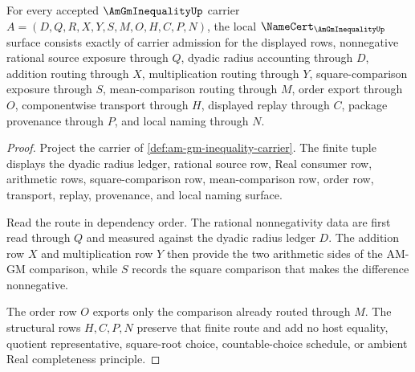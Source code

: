 \begin{theorem}
\label{thm:am-gm-inequality-namecert-obligations}
For every accepted $\AmGmInequalityUp$ carrier $A=(D,Q,R,X,Y,S,M,O,H,C,P,N)$, the local $\NameCert_{\AmGmInequalityUp}$ surface consists exactly of carrier admission for the displayed rows, nonnegative rational source exposure through $Q$, dyadic radius accounting through $D$, addition routing through $X$, multiplication routing through $Y$, square-comparison exposure through $S$, mean-comparison routing through $M$, order export through $O$, componentwise transport through $H$, displayed replay through $C$, package provenance through $P$, and local naming through $N$.
\end{theorem}
\begin{proof}
Project the carrier of \autoref{def:am-gm-inequality-carrier}. The finite tuple displays the dyadic radius ledger, rational source row, Real consumer row, arithmetic rows, square-comparison row, mean-comparison row, order row, transport, replay, provenance, and local naming surface.

Read the route in dependency order. The rational nonnegativity data are first read through $Q$ and measured against the dyadic radius ledger $D$. The addition row $X$ and multiplication row $Y$ then provide the two arithmetic sides of the AM-GM comparison, while $S$ records the square comparison that makes the difference nonnegative.

The order row $O$ exports only the comparison already routed through $M$. The structural rows $H,C,P,N$ preserve that finite route and add no host equality, quotient representative, square-root choice, countable-choice schedule, or ambient Real completeness principle.
\end{proof}

